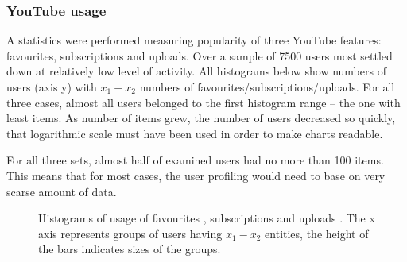 \subsubsection{YouTube usage}

A statistics were performed measuring popularity of three YouTube features: favourites,
subscriptions and uploads. Over a sample of 7500 users most settled down at
relatively low level of activity. All histograms below show numbers of users
(axis y) with $x_1-x_2$ numbers of favourites/subscriptions/uploads. For all
three cases, almost all users belonged to the first histogram range -- the one
with least items. As number of items grew, the number of users decreased so
quickly, that logarithmic scale must have been used in order to make charts
readable.

For all three sets, almost half of examined users had no more than 100 items.
This means that for most cases, the user profiling would need to base on very
scarse amount of data.

\begin{figure}[ht]
  \centering
  \label{fig:subfigureExample}
  \caption{Histograms of usage of favourites , subscriptions
   and uploads . The x axis represents groups of
  users having $x_1-x_2$ entities, the height of the bars indicates sizes of the
  groups.}
\end{figure}


